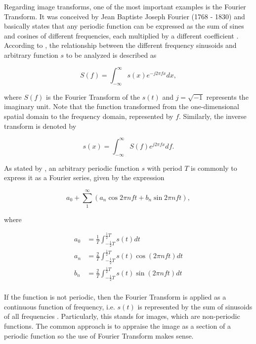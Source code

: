 Regarding image transforms, one of the most important examples is the Fourier Transform. It was conceived by Jean Baptiste Joseph Fourier (1768 - 1830) and basically states that any periodic function can be expressed as the sum of sines and cosines of different frequencies, each multiplied by a different coefficient \cite{gonzalez2018digital}. According to , the relationship between the different frequency sinusoids and arbitrary function $s$ to be analyzed is described as

\begin{equation}
\label{eqn:fourier_transform}
S(f) = \int_{-\infty}^{\infty}s(x)e^{-j 2 \pi f x} dx,
\end{equation}

\noindent where $S(f)$ is the Fourier Transform of the $s(t)$ and $j = \sqrt{-1}$ represents the imaginary unit. Note that the function transformed from the one-dimensional spatial domain to the frequency domain, represented by $f$. Similarly, the inverse transform is denoted by

\begin{equation}
\label{eqn:inverse_fourier_transform}
s(x) = \int_{-\infty}^{\infty}S(f)e^{j 2 \pi f x} df.
\end{equation}

As stated by , an arbitrary periodic function $s$ with period $T$ is commonly to express it as a Fourier series, given by the expression

\begin{equation}
\label{eqn:fourier_series}
a_{0} + \sum_{1}^{\infty} (a_{n} \cos{2 \pi n f t} + b_{n} \sin{2 \pi n f t}),
\end{equation}

\noindent where

\begin{align*}
a_{0} &= \frac{1}{T} \int_{-\frac{1}{2} T}^{\frac{1}{2} T} s(t) dt\\
a_{n} &= \frac{2}{T} \int_{-\frac{1}{2} T}^{\frac{1}{2} T} s(t) \cos{(2 \pi n f t)} dt\\
b_{n} &= \frac{2}{T} \int_{-\frac{1}{2} T}^{\frac{1}{2} T} s(t) \sin{(2 \pi n f t)} dt\\
\end{align*}

If the function is not periodic, then the Fourier Transform is applied as a continuous function of frequency, i.e. $s(t)$ is represented by the sum of sinusoids of all frequencies \cite{brigham1988fast}. Particularly, this stands for images, which are non-periodic functions. The common approach is to appraise the image as a section of a periodic function so the use of Fourier Transform makes sense.

